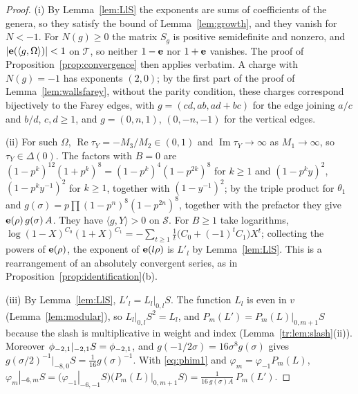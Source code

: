 \begin{proof}
(i) By Lemma~\ref{lem:LlS} the exponents are sums of coefficients of the genera, so they satisfy the bound of Lemma~\ref{lem:growth}, and they vanish for $N<-1$. For $N(g)\ge0$ the matrix $S_g$ is positive semidefinite and nonzero, and $|{\mathbf e(\langle g,\Omega\rangle)}|<1$ on $\mathcal T$, so neither $1-\mathbf e$ nor $1+\mathbf e$ vanishes. The proof of Proposition~\ref{prop:convergence} then applies verbatim. A charge with $N(g)=-1$ has exponents $(2,0)$; by the first part of the proof of Lemma~\ref{lem:wallsfarey}, without the parity condition, these charges correspond bijectively to the Farey edges, with $g=(cd,ab,ad+bc)$ for the edge joining $a/c$ and $b/d$, $c,d\ge1$, and $g=(0,n,1)$, $(0,-n,-1)$ for the vertical edges.

(ii) For such $\Omega$, $\operatorname{Re}\tau_Y=-M_3/M_2\in(0,1)$ and $\operatorname{Im}\tau_Y\to\infty$ as $M_1\to\infty$, so $\tau_Y\in\Delta(0)$. The factors with $B=0$ are $(1-p^k)^{12}(1+p^k)^8=(1-p^k)^4(1-p^{2k})^8$ for $k\ge1$ and $(1-p^ky)^2$, $(1-p^{k}y^{-1})^2$ for $k\ge1$, together with $(1-y^{-1})^2$; by the triple product for $\theta_1$ and $g(\sigma)=p\prod(1-p^n)^8(1-p^{2n})^8$, together with the prefactor they give $\mathbf e(\rho)\,g(\sigma)\,A$. They have $\langle g,Y\rangle>0$ on $\mathcal S$. For $B\ge1$ take logarithms, $\log(1-X)^{C_0}(1+X)^{C_1}=-\sum_{t\ge1}\frac1t\big(C_0+(-1)^tC_1\big)X^t$; collecting the powers of $\mathbf e(\rho)$, the exponent of $\mathbf e(l\rho)$ is $L'_l$ by Lemma~\ref{lem:LlS}. This is a rearrangement of an absolutely convergent series, as in Proposition~\ref{prop:identification}(b).

(iii) By Lemma~\ref{lem:LlS}, $L'_l=L_l|_{0,l}S$. The function $L_l$ is even in $v$ (Lemma~\ref{lem:modular}), so $L_l|_{0,l}S^2=L_l$, and $P_m(L')=P_m(L)|_{0,m+1}S$ because the slash is multiplicative in weight and index (Lemma~\ref{tr:lem:slash}(ii)). Moreover $\phi_{-2,1}|_{-2,1}S=\phi_{-2,1}$, and $g(-1/2\sigma)=16\sigma^8g(\sigma)$ gives $g(\sigma/2)^{-1}|_{-8,0}S=\frac1{16}g(\sigma)^{-1}$. With \eqref{eq:phim1} and $\varphi_m=\varphi_{-1}P_m(L)$, $\varphi_m|_{-6,m}S=\big(\varphi_{-1}|_{-6,-1}S\big)\big(P_m(L)|_{0,m+1}S\big)=\frac1{16\,g(\sigma)A}\,P_m(L')$.

\end{proof}


